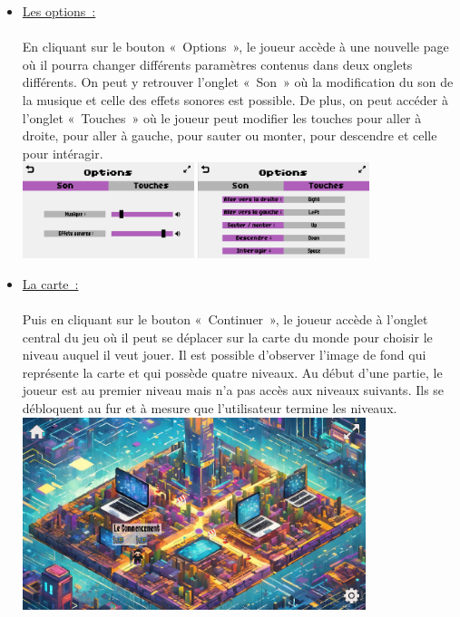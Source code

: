 \documentclass[12pt,a4paper]{article}
\begin{document}
\begin{itemize}
                \newpage

                \item \tabto{1cm} \underline{Les options~:}\\\\
                \tabto{1cm} En cliquant sur le bouton «~Options~», le joueur accède à une nouvelle page où il pourra changer différents paramètres contenus dans deux onglets différents. On peut y retrouver l’onglet «~Son~» où la modification du son de la musique et celle des effets sonores est possible. De plus, on peut accéder à l’onglet «~Touches~» où le joueur peut modifier les touches pour aller à droite, pour aller à gauche, pour sauter ou monter, pour descendre et celle pour intéragir.\\

                \includegraphics[width=5cm]{images/options_son.png}
                \includegraphics[width=5cm]{images/options_touches.png}\\
                
                \item \tabto{1cm} \underline{La carte~:}\\\\
                \tabto{1cm} Puis en cliquant sur le bouton «~Continuer~», le joueur accède à l’onglet central du jeu où il peut se déplacer sur la carte du monde pour choisir le niveau auquel il veut jouer. Il est possible d'observer l’image de fond qui représente la carte et qui possède quatre niveaux. Au début d’une partie, le joueur est au premier niveau mais n’a pas accès aux niveaux suivants. Ils se débloquent au fur et à mesure que l’utilisateur termine les niveaux.\\

                \includegraphics[width=10cm]{images/carte.png}\\
                
            \end{itemize}
\end{document}
